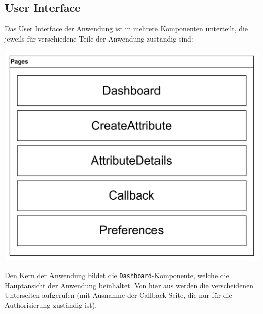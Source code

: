 \subsection{User Interface}
Das User Interface der Anwendung ist in mehrere Komponenten 
 unterteilt, die jeweils für verschiedene Teile der Anwendung zuständig sind:\break
\begin{center}
    \includegraphics[width=\linewidth]{./img/dashboardFileStructure.png}
\end{center}
Den Kern der Anwendung bildet die \texttt{Dashboard}-Komponente, welche die Hauptansicht der Anwendung beinhaltet. Von hier aus werden die verscheidenen
Unterseiten aufgerufen (mit Ausnahme der Callback-Seite, die nur für die Authorisierung zuständig ist).
